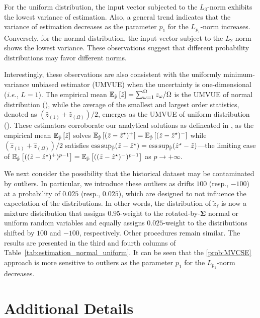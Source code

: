 \documentclass[mnsc, nonblindrev]{informswp}
\newcommand{\1}[1]{\mathds{1}{\left(#1\right)}}
\begin{document}
\begin{appendices}
For the uniform distribution, the input vector subjected to the $L_3$-norm exhibits the lowest variance of estimation. Also, a general trend indicates that the variance of estimation decreases as the parameter $p_1$ for the $L_{p_1}$-norm increases. Conversely, for the normal distribution, the input vector subject to the $L_2$-norm shows the lowest variance. These observations suggest that different probability distributions may favor different norms. 

Interestingly, these observations are also consistent with the uniformly minimum-variance unbiased estimator (UMVUE) when the uncertainty is one-dimensional (\textit{i.e.}, $L = 1$). The empirical mean $\mathbb{E}_{\hat{\mathbb{P}}}\left[\tilde{z}\right] =  \sum_{\omega = 1}^\Omega z_\omega/\Omega$ is the UMVUE of normal distribution (\citealt{rohatgi2015introduction}), while the average of the smallest and largest order statistics, denoted as $(\hat z_{(1)} + \hat{z}_{(\Omega)})/2$, emerges as the UMVUE of uniform distribution (\citealt{bar1985minimum}). 
These estimators corroborate our analytical solutions as delineated in , as the empirical mean $\mathbb{E}_{\hat{\mathbb{P}}}\left[\tilde z\right]$ solves $\mathbb{E}_{\hat{\mathbb{P}}}\left[(\tilde{z} -\hat{z}^\star )^+\right] = \mathbb{E}_{\hat{\mathbb{P}}}\left[(\tilde{z} - \hat{z}^\star )^-\right]$ while $(\hat{z}_{(1)} + \hat{z}_{(\Omega)})/2$ satisfies $\operatorname*{ess\,sup}_{\hat{\mathbb{P}}}(\tilde{z} - \hat{z}^\star ) = \operatorname*{ess\,sup}_{\hat{\mathbb{P}}} ( \hat{z}^\star - \tilde{z})$---the limiting case of $\mathbb{E}_{\hat{\mathbb{P}}}\left[((\tilde z - \hat z^\star)^{+})^{p-1}\right] = \mathbb{E}_{\hat{\mathbb{P}}}\left[((\tilde z - \hat z^\star)^{-})^{p-1}\right]$ as $p \to +\infty$.

We next consider the possibility that the historical dataset may be contaminated by outliers. In particular, we introduce these outliers as drifts $100$ (resp., $-100$) at a probability of $0.025$ (resp., $0.025$), which are designed to not influence the expectation of the distributions. In other words, the distribution of $\tilde z_\ell$ is now a mixture distribution that assigns $0.95$-weight to the rotated-by-$\bm \Sigma$ normal or uniform random variables and equally assigns $0.025$-weight to the distributions shifted by $100$ and $-100$, respectively. Other procedures remain similar. The results are presented in the third and fourth columns of Table~\ref{tab:estimation_normal_uniform}. It can be seen that the \ref{prob:MVCSE} approach is more sensitive to outliers as the parameter $p_1$ for the $L_{p_1}$-norm decreases.


\section{Additional Details}
\label{sec:additional_figures}


\end{appendices}
\end{document}
